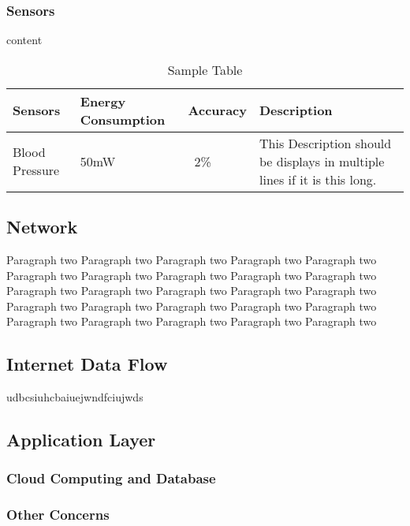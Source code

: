 \documentclass[10pt,journal,final,a4paper,nofonttune]{IEEEtran}
\begin{document}
\subsubsection{Sensors} 

content

\begin{table}[h]
    \caption{Sample Table}
    \begin{center}
        \begin{tabular}{|p{1cm}|p{2cm}|p{1cm}|p{2cm}|}
            \hline
            Sensors & Energy Consumption & Accuracy & Description \\ \hline
            Blood Pressure & 50mW & ~2\% & This Description should be displays in multiple lines if it is this long. \\ 
            \hline
        \end{tabular}
    \end{center}
\end{table}


\subsection{Network}

Paragraph two Paragraph two Paragraph two Paragraph two Paragraph two 
Paragraph two Paragraph two Paragraph two Paragraph two Paragraph two 
Paragraph two Paragraph two Paragraph two Paragraph two Paragraph two 
Paragraph two Paragraph two Paragraph two Paragraph two Paragraph two 
Paragraph two Paragraph two Paragraph two Paragraph two Paragraph two 

\subsection{Internet Data Flow}


udbcsiuhcbaiuejwndfciujwds


\subsection{Application Layer}


\subsubsection{Cloud Computing and Database}

\subsubsection{Other Concerns}
\end{document}
